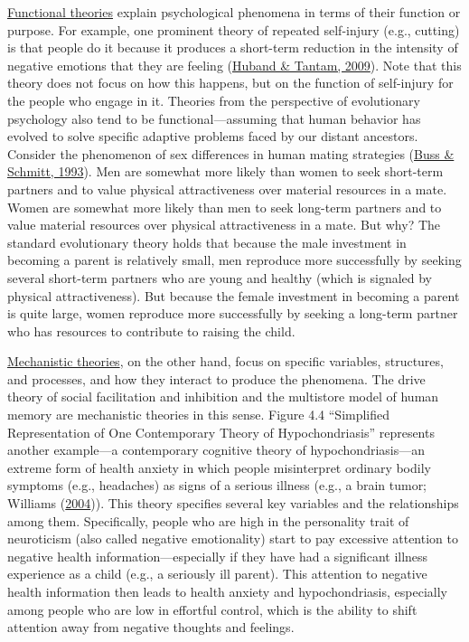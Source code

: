 \documentclass[
]{krantz}
\begin{document}
\protect\hyperlink{functional-theory}{Functional theories} explain psychological phenomena in terms of their function or purpose. For example, one prominent theory of repeated self-injury (e.g., cutting) is that people do it because it produces a short-term reduction in the intensity of negative emotions that they are feeling (\protect\hyperlink{ref-huband2009understanding}{Huband \& Tantam, 2009}). Note that this theory does not focus on how this happens, but on the function of self-injury for the people who engage in it. Theories from the perspective of evolutionary psychology also tend to be functional---assuming that human behavior has evolved to solve specific adaptive problems faced by our distant ancestors. Consider the phenomenon of sex differences in human mating strategies (\protect\hyperlink{ref-buss1993sexual}{Buss \& Schmitt, 1993}). Men are somewhat more likely than women to seek short-term partners and to value physical attractiveness over material resources in a mate. Women are somewhat more likely than men to seek long-term partners and to value material resources over physical attractiveness in a mate. But why? The standard evolutionary theory holds that because the male investment in becoming a parent is relatively small, men reproduce more successfully by seeking several short-term partners who are young and healthy (which is signaled by physical attractiveness). But because the female investment in becoming a parent is quite large, women reproduce more successfully by seeking a long-term partner who has resources to contribute to raising the child.

\protect\hyperlink{mechanistic-theory}{Mechanistic theories}, on the other hand, focus on specific variables, structures, and processes, and how they interact to produce the phenomena. The drive theory of social facilitation and inhibition and the multistore model of human memory are mechanistic theories in this sense. Figure 4.4 ``Simplified Representation of One Contemporary Theory of Hypochondriasis'' represents another example---a contemporary cognitive theory of hypochondriasis---an extreme form of health anxiety in which people misinterpret ordinary bodily symptoms (e.g., headaches) as signs of a serious illness (e.g., a brain tumor; Williams (\protect\hyperlink{ref-williams2004psychopathology}{2004})). This theory specifies several key variables and the relationships among them. Specifically, people who are high in the personality trait of neuroticism (also called negative emotionality) start to pay excessive attention to negative health information---especially if they have had a significant illness experience as a child (e.g., a seriously ill parent). This attention to negative health information then leads to health anxiety and hypochondriasis, especially among people who are low in effortful control, which is the ability to shift attention away from negative thoughts and feelings.
\end{document}

